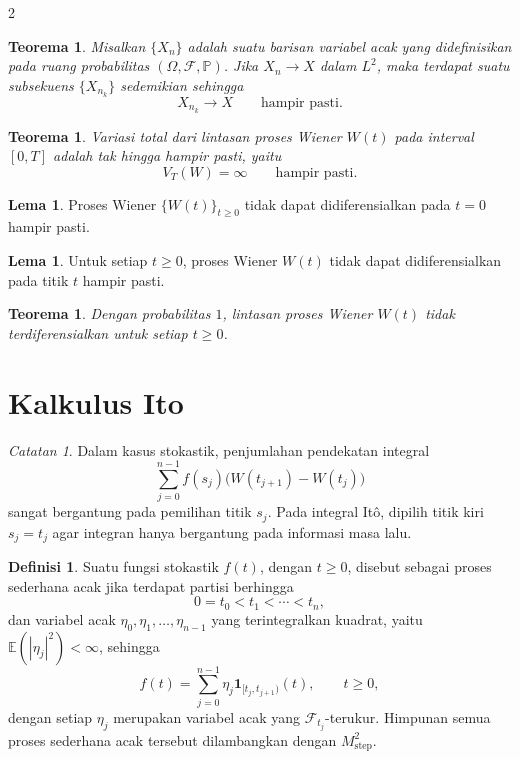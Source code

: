 \documentclass[a4paper,extrafontsizes, 9pt]{memoir}
\theoremstyle{definition}
\newtheorem{definisi}[kalstok]{Definisi}
\newtheorem{lemma}[kalstok]{Lema}
\theoremstyle{plain}
\newtheorem{teorema}[kalstok]{Teorema}
\theoremstyle{remark}
\newtheorem{catatan}[kalstok]{Catatan}
\begin{document}
\begin{multicols}{2}
  \begin{teorema}
    Misalkan $\{X_n\}$ adalah suatu barisan variabel acak yang didefinisikan pada ruang
    probabilitas $(\Omega,\mathcal{F},\mathbb{P})$. Jika $X_n\to X$ dalam $L^2$, maka terdapat
    suatu subsekuens $\{X_{n_k}\}$ sedemikian sehingga
    \[X_{n_k}\to X\qquad \text{hampir pasti}.\]
  \end{teorema}

  \begin{teorema}
    Variasi total dari lintasan proses Wiener $W(t)$ pada interval $[0,T]$ adalah tak hingga
    hampir pasti, yaitu
    \[V_T(W)=\infty\qquad \text{hampir pasti}.\]
  \end{teorema}

  \begin{lemma}
    Proses Wiener $\{W(t)\}_{t\ge 0}$ tidak dapat didiferensialkan pada $t=0$ hampir pasti.
  \end{lemma}

  \begin{lemma}
    Untuk setiap $t\ge 0$, proses Wiener $W(t)$ tidak dapat didiferensialkan pada titik $t$
    hampir pasti.
  \end{lemma}

  \begin{teorema}
    Dengan probabilitas $1$, lintasan proses Wiener $W(t)$ tidak terdiferensialkan untuk setiap
    $t\ge 0$.
  \end{teorema}

  \section{\small Kalkulus Ito}

  \begin{catatan}
    Dalam kasus stokastik, penjumlahan pendekatan integral
    \[\sum_{j=0}^{n-1} f(s_j)\bigl(W(t_{j+1})-W(t_j)\bigr)\]
    sangat bergantung pada pemilihan titik $s_j$. Pada integral It\^o, dipilih titik kiri
    $s_j=t_j$ agar integran hanya bergantung pada informasi masa lalu.
  \end{catatan}

  \begin{definisi}
    Suatu fungsi stokastik $f(t)$, dengan $t\ge 0$, disebut sebagai proses sederhana acak jika
    terdapat partisi berhingga
    \[0=t_0<t_1<\cdots<t_n,\]
    dan variabel acak $\eta_0,\eta_1,\ldots,\eta_{n-1}$ yang terintegralkan kuadrat, yaitu
    $\mathbb{E}(|\eta_j|^2)<\infty$, sehingga
    \[f(t)=\sum_{j=0}^{n-1}\eta_j\mathbf{1}_{[t_j,t_{j+1})}(t),\qquad t\ge 0,\]
    dengan setiap $\eta_j$ merupakan variabel acak yang $\mathcal{F}_{t_j}$-terukur.
    Himpunan semua proses sederhana acak tersebut dilambangkan dengan $M_{\text{step}}^2$.
  \end{definisi}


\end{multicols}
\end{document}
